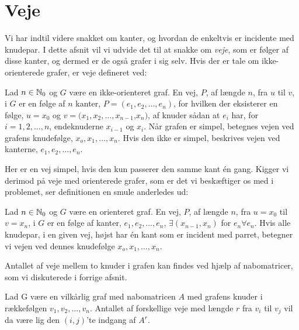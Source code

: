 \section{Veje}
Vi har indtil videre snakket om kanter, og hvordan de enkeltvis er incidente med knudepar. I dette afsnit vil vi udvide det til at snakke om \emph{veje}, som er følger af disse kanter, og dermed er de også grafer i sig selv. Hvis der er tale om ikke-orienterede grafer, er veje defineret ved:
\begin{defn}
Lad $n \in \mathbb{N} _0$  og $G$ være en ikke-orienteret graf. En vej, $P$, af længde $n$, fra $u$ til $v$, i $G$ er en følge af $n$ kanter,  $ P= (e_{1},e_{2},\dotsc,e_{n})$, for hvilken der eksisterer en følge, $u=x_{0}$ og $v=(x_{1},x_{2},\dotsc,x_{n-1}$,$x_{n})$, af knuder sådan at $e_{i}$ har, for $i=1,2,\dotsc,n$, endeknuderne $x_{i-1}$ og $x_{i}$. Når grafen er simpel, betegnes vejen ved grafens knudefølge, $x_{o},x_{1},\dotsc,x_{n}$. Hvis den ikke er simpel, beskrives vejen ved kanterne, $e_{1},e_{2},\dotsc,e_{n}$. 
\end{defn}
Her er en vej simpel, hvis den kun passerer den samme kant én gang. Kigger vi derimod på veje med orienterede grafer, som er det vi beskæftiger os med i problemet, ser definitionen en smule anderledes ud:
\begin{defn}
Lad $n \in \mathbb{N} _0$ og $G$ være en orienteret graf. En vej, $P$, af længde $n$, fra $u = x_0$ til $v = x_n$, i $G$ er en følge af kanter, $e_{1},e_{2},\dotsc,e_{n}$, $ \exists (x_{n-1},x_{n}) $ for $e_{n} \forall e_n$. Hvis alle knudepar, i en given vej, højst har én kant som er incident med parret, betegner vi vejen ved dennes knudefølge $x_{o},x_{1},\dotsc,x_{n}$.
\end{defn}



Antallet af veje mellem to knuder i grafen kan findes ved hjælp af nabomatricer, som vi diskuterede i forrige afsnit.
\begin{thm}
Lad G være en vilkårlig graf med nabomatricen
\textbf{$A$} med grafens knuder i rækkefølgen $v_{1},v_{2},\dotsc,v_{n}$. Antallet af forskellige veje med længde $r$ fra $v_{i}$ til $v_{j}$ vil da være lig den $(i,j)$'te indgang af \textbf{$A^{r}$}.
\end{thm}

